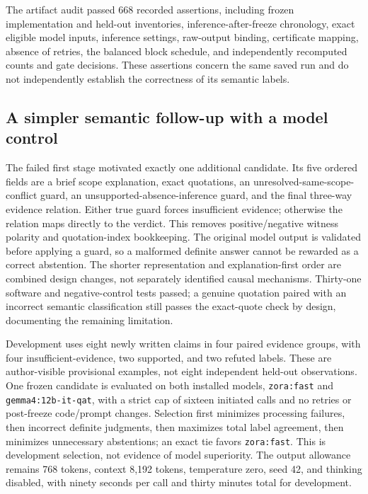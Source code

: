 The artifact audit passed 668 recorded assertions, including frozen implementation and held-out inventories, inference-after-freeze chronology, exact eligible model inputs, inference settings, raw-output binding, certificate mapping, absence of retries, the balanced block schedule, and independently recomputed counts and gate decisions. These assertions concern the same saved run and do not independently establish the correctness of its semantic labels.

\subsection{A simpler semantic follow-up with a model control}
The failed first stage motivated exactly one additional candidate. Its five ordered fields are a brief scope explanation, exact quotations, an unresolved-same-scope-conflict guard, an unsupported-absence-inference guard, and the final three-way evidence relation. Either true guard forces insufficient evidence; otherwise the relation maps directly to the verdict. This removes positive/negative witness polarity and quotation-index bookkeeping. The original model output is validated before applying a guard, so a malformed definite answer cannot be rewarded as a correct abstention. The shorter representation and explanation-first order are combined design changes, not separately identified causal mechanisms. Thirty-one software and negative-control tests passed; a genuine quotation paired with an incorrect semantic classification still passes the exact-quote check by design, documenting the remaining limitation.

Development uses eight newly written claims in four paired evidence groups, with four insufficient-evidence, two supported, and two refuted labels. These are author-visible provisional examples, not eight independent held-out observations. One frozen candidate is evaluated on both installed models, \texttt{zora:fast} and \texttt{gemma4:12b-it-qat}, with a strict cap of sixteen initiated calls and no retries or post-freeze code/prompt changes. Selection first minimizes processing failures, then incorrect definite judgments, then maximizes total label agreement, then minimizes unnecessary abstentions; an exact tie favors \texttt{zora:fast}. This is development selection, not evidence of model superiority. The output allowance remains 768 tokens, context 8,192 tokens, temperature zero, seed 42, and thinking disabled, with ninety seconds per call and thirty minutes total for development.

